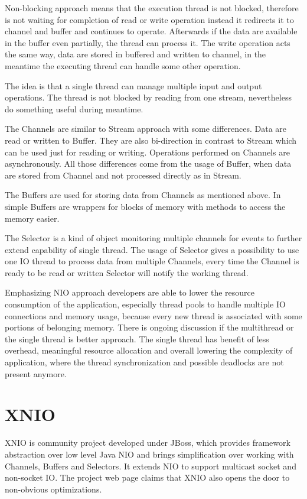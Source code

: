 \documentclass[12pt,final,oneside]{fithesis2}
\begin{document}
Non-blocking approach means that the execution thread is not blocked, therefore is not waiting for completion of read or write operation instead it redirects it to channel and buffer and continues to operate. Afterwards if the data are available in the buffer even partially, the thread can process it. The write operation acts the same way, data are stored in buffered and written to channel, in the meantime the executing thread can handle some other operation.

The idea is that a single thread can manage multiple input and output operations. The thread is not blocked by reading from one stream, nevertheless do something useful during meantime.

The Channels are similar to Stream approach with some differences. Data are read or written to Buffer. They are also bi-direction in contrast to Stream which can be used just for reading or writing. Operations performed on Channels are asynchronously. All those differences come from the usage of Buffer, when data are stored from Channel and not processed directly as in Stream.

The Buffers are used for storing data from Channels as mentioned above. In simple Buffers are wrappers for blocks of memory with methods to access the memory easier.  

The Selector is a kind of object monitoring multiple channels for events to further extend capability of single thread. The usage of Selector gives a possibility to use one IO thread to process data from multiple Channels, every time the Channel is ready to be read or written Selector will notify the working thread.

Emphasizing NIO approach developers are able to lower the resource consumption of the application, especially thread pools to handle multiple IO connections and memory usage, because every new thread is associated with some portions of belonging memory. There is ongoing discussion if the multithread or the single thread is better approach. The single thread has benefit of less overhead, meaningful resource allocation and overall lowering the complexity of application, where the thread synchronization and possible deadlocks are not present anymore.  

\section{XNIO}
XNIO is community project developed under JBoss, which provides framework abstraction over low level Java NIO and brings simplification over working with Channels, Buffers and Selectors. It extends NIO to support multicast socket and non-socket IO. The project web page claims that XNIO also opens the door to non-obvious optimizations.
\end{document}

